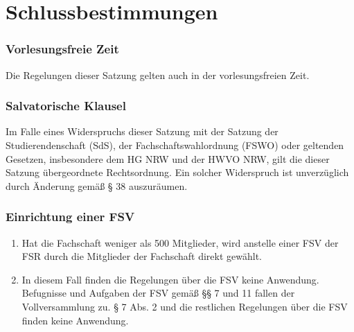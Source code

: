 \documentclass{article}
\begin{document}
\part{Schlussbestimmungen}
\section{Vorlesungsfreie Zeit}
Die Regelungen dieser Satzung gelten auch in der vorlesungsfreien Zeit.

\section{Salvatorische Klausel}
Im Falle eines Widerspruchs dieser Satzung mit der Satzung der Studierendenschaft (SdS), der Fachschaftswahlordnung (FSWO) oder geltenden Gesetzen, insbesondere dem HG NRW und der HWVO NRW, gilt die dieser Satzung übergeordnete Rechtsordnung. Ein solcher  Widerspruch  ist  unverzüglich durch Änderung gemäß § 38 auszuräumen.

\section{Einrichtung einer FSV}
\begin{enumerate}[(1)]
    \item Hat die Fachschaft weniger als 500 Mitglieder, wird anstelle einer FSV der FSR durch die Mitglieder der Fachschaft direkt gewählt.
    \item In diesem Fall finden  die Regelungen über die FSV keine Anwendung. Befugnisse und Aufgaben der FSV gemäß §§ 7 und 11 fallen der Vollversammlung zu. § 7 Abs. 2 und die restlichen Regelungen über die FSV finden keine Anwendung.
\end{enumerate}
\end{document}
